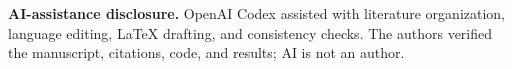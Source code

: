 \noindent\textbf{AI-assistance disclosure.}  OpenAI Codex assisted with
literature organization, language editing, LaTeX drafting, and consistency
checks.  The authors verified the manuscript, citations, code, and results; AI
is not an author.
